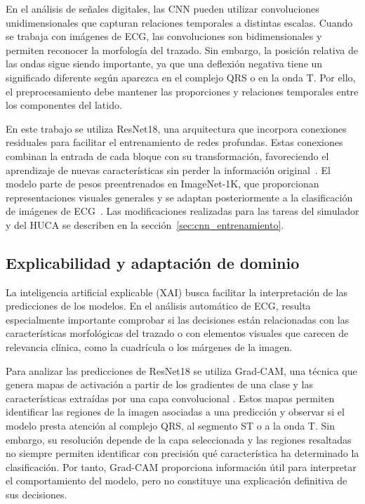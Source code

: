 En el análisis de señales digitales, las CNN pueden utilizar convoluciones unidimensionales que capturan relaciones temporales a distintas escalas. Cuando se trabaja con imágenes de ECG, las convoluciones son bidimensionales y permiten reconocer la morfología del trazado. Sin embargo, la posición relativa de las ondas sigue siendo importante, ya que una deflexión negativa tiene un significado diferente según aparezca en el complejo QRS o en la onda T. Por ello, el preprocesamiento debe mantener las proporciones y relaciones temporales entre los componentes del latido.

En este trabajo se utiliza ResNet18, una arquitectura que incorpora conexiones residuales para facilitar el entrenamiento de redes profundas. Estas conexiones combinan la entrada de cada bloque con su transformación, favoreciendo el aprendizaje de nuevas características sin perder la información original~\cite{he2016}. El modelo parte de pesos preentrenados en ImageNet-1K, que proporcionan representaciones visuales generales y se adaptan posteriormente a la clasificación de imágenes de ECG~\cite{russakovsky2015imagenet,torchvisionresnet18}. Las modificaciones realizadas para las tareas del simulador y del HUCA se describen en la sección~\ref{sec:cnn_entrenamiento}.

\subsection{Explicabilidad y adaptación de dominio}
\label{sec:explicabilidad}

La inteligencia artificial explicable (XAI) busca facilitar la interpretación de las predicciones de los modelos. En el análisis automático de ECG, resulta especialmente importante comprobar si las decisiones están relacionadas con las características morfológicas del trazado o con elementos visuales que carecen de relevancia clínica, como la cuadrícula o los márgenes de la imagen.

Para analizar las predicciones de ResNet18 se utiliza Grad-CAM, una técnica que genera mapas de activación a partir de los gradientes de una clase y las características extraídas por una capa convolucional \cite{selvaraju2017}. Estos mapas permiten identificar las regiones de la imagen asociadas a una predicción y observar si el modelo presta atención al complejo QRS, al segmento ST o a la onda T. Sin embargo, su resolución depende de la capa seleccionada y las regiones resaltadas no siempre permiten identificar con precisión qué característica ha determinado la clasificación. Por tanto, Grad-CAM proporciona información útil para interpretar el comportamiento del modelo, pero no constituye una explicación definitiva de sus decisiones.

